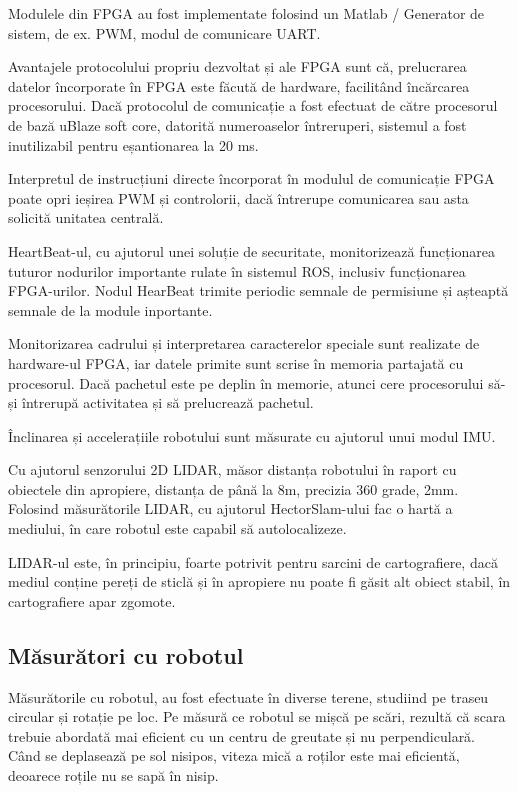\begin{titlepage}
Modulele din FPGA au fost implementate folosind un Matlab / Generator de sistem, de ex. PWM, modul de comunicare UART.

Avantajele protocolului propriu dezvoltat și ale FPGA sunt că, prelucrarea datelor încorporate în FPGA este făcută de hardware, facilitând încărcarea procesorului. Dacă protocolul de comunicație a fost efectuat de către procesorul de bază uBlaze soft core, datorită numeroaselor întreruperi, sistemul a fost inutilizabil pentru eșantionarea la 20 ms.

Interpretul de instrucțiuni directe încorporat în modulul de comunicație FPGA poate opri ieșirea PWM și controlorii, dacă întrerupe comunicarea sau asta solicită unitatea centrală.

HeartBeat-ul, cu ajutorul unei soluție de securitate, monitorizează funcționarea tuturor nodurilor importante rulate în sistemul ROS, inclusiv funcționarea FPGA-urilor. Nodul HearBeat trimite periodic semnale de permisiune și așteaptă semnale de la module inportante.

Monitorizarea cadrului și interpretarea caracterelor speciale sunt realizate de hardware-ul FPGA, iar datele primite sunt scrise în memoria partajată cu procesorul. Dacă pachetul este pe deplin în memorie, atunci cere procesorului să-și întrerupă activitatea și să prelucrează pachetul.

Înclinarea și accelerațiile robotului sunt măsurate cu ajutorul unui modul IMU.

Cu ajutorul senzorului 2D LIDAR, măsor distanța robotului în raport cu obiectele din apropiere, distanța de până la 8m, precizia 360 grade, 2mm. Folosind măsurătorile LIDAR, cu ajutorul HectorSlam-ului fac o hartă a mediului, în care robotul este capabil să autolocalizeze.

LIDAR-ul este, în principiu, foarte potrivit pentru sarcini de cartografiere, dacă mediul conține pereți de sticlă și în apropiere nu poate fi găsit alt obiect stabil, în cartografiere apar zgomote.


\subsection*{ Măsurători cu robotul}

Măsurătorile cu robotul, au fost efectuate în diverse terene, studiind pe traseu circular și rotație pe loc. Pe măsură ce robotul se mișcă pe scări, rezultă că scara trebuie abordată mai eficient cu un centru de greutate și nu perpendiculară. Când se deplasează pe sol nisipos, viteza mică a roților este mai eficientă, deoarece roțile nu se sapă în nisip.




\end{titlepage}
